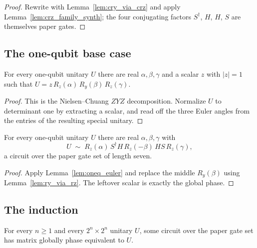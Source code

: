 \begin{proof}
  \leanok
  Rewrite with Lemma~\ref{lem:cry_via_crz} and apply
  Lemma~\ref{lem:crz_family_synth}; the four conjugating factors $S^\dagger$,
  $H$, $H$, $S$ are themselves paper gates.
\end{proof}

\subsection{The one-qubit base case}

\begin{lemma}
  \label{lem:oneq_euler}
  \leanok
  For every one-qubit unitary $U$ there are real $\alpha, \beta, \gamma$ and a
  scalar $z$ with $\lvert z\rvert = 1$ such that
  $U = z\,R_z(\alpha)\,R_y(\beta)\,R_z(\gamma)$.
\end{lemma}

\begin{proof}
  \leanok
  This is the Nielsen--Chuang $ZYZ$ decomposition.  Normalize $U$ to determinant
  one by extracting a scalar, and read off the three Euler angles from the
  entries of the resulting special unitary.
\end{proof}

\begin{lemma}
  \label{lem:oneq_base}
  \leanok
  For every one-qubit unitary $U$ there are real $\alpha, \beta, \gamma$ with
  \[
    U \;\sim\; R_z(\alpha)\, S^\dagger H\, R_z(-\beta)\, H S\, R_z(\gamma),
  \]
  a circuit over the paper gate set of length seven.
\end{lemma}

\begin{proof}
  \leanok
  Apply Lemma~\ref{lem:oneq_euler} and replace the middle $R_y(\beta)$ using
  Lemma~\ref{lem:ry_via_rz}.  The leftover scalar is exactly the global phase.
\end{proof}

\subsection{The induction}

\begin{theorem}
  \label{thm:clifford_rz_universal}
  \leanok
  For every $n \ge 1$ and every $2^n \times 2^n$ unitary $U$, some circuit over
  the paper gate set has matrix globally phase equivalent to $U$.
\end{theorem}

